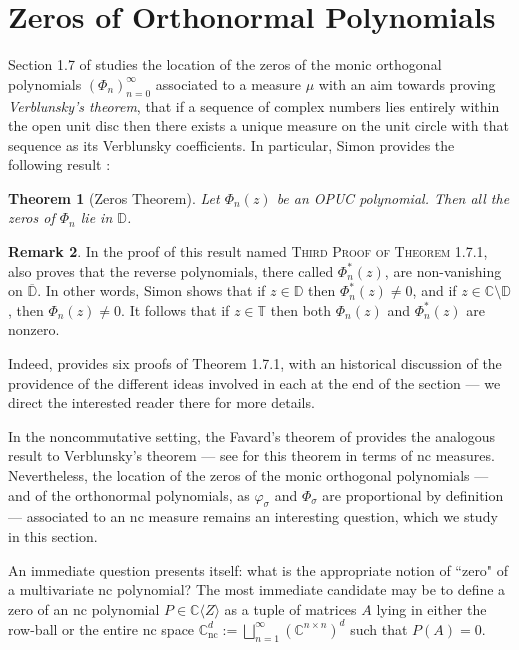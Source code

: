\documentclass[11pt,reqno]{amsart}
\def\p{\varphi}
\def\s{\sigma}
\def\P{\Phi}
\def\CC{\mathbb{C}}
\def\DD{\mathbb{D}}
\def\TT{\mathbb{T}}
\def\nc{\mathrm{nc}}
\def\dju{\bigsqcup_{n=1}^{\infty}}
\newtheorem{theorem}{Theorem}[section]
\theoremstyle{definition}
\newtheorem{remark}[theorem]{Remark}
\numberwithin{equation}{section}
\begin{document}
\section{Zeros of Orthonormal Polynomials}

Section 1.7 of \cite{Sim05} studies the location of the zeros of the monic orthogonal polynomials \((\P_n)_{n=0}^{\infty}\) associated to a measure \(\mu\) with an aim towards proving \emph{Verblunsky's theorem}, that if a sequence of complex numbers lies entirely within the open unit disc then there exists a unique measure on the unit circle with that sequence as its Verblunsky coefficients. In particular, Simon provides the following result \cite[Theorem 1.7.1]{Sim05}:
\begin{theorem}[Zeros Theorem]
    Let \(\P_n (z)\) be an OPUC polynomial. Then all the zeros of \(\P_n\) lie in \(\DD\).
\end{theorem}
\begin{remark}
    \label{rem:CommZeros}
    In the proof of this result named \textsc{Third Proof of Theorem 1.7.1}, \cite{Sim05} also proves that the reverse polynomials, there called \(\P_n^*(z)\), are non-vanishing on \(\overline{\DD}\). In other words, Simon shows that if \(z \in \DD\) then \(\P_n^*(z) \neq 0\), and if \(z \in \CC\setminus\DD\), then \(\P_n(z) \neq 0\). It follows that if \(z \in \TT\) then both \(\P_n(z)\) and \(\P_n^*(z)\) are nonzero.
\end{remark}
Indeed, \cite{Sim05} provides six proofs of Theorem 1.7.1, with an historical discussion of the providence of the different ideas involved in each at the end of the section --- we direct the interested reader there for more details.

In the noncommutative setting, the Favard's theorem of \cite{CJ02b} provides the analogous result to Verblunsky's theorem --- see  for this theorem in terms of nc measures. Nevertheless, the location of the zeros of the monic orthogonal polynomials --- and of the orthonormal polynomials, as \(\p_\s\) and \(\P_\s\) are proportional by definition --- associated to an nc measure remains an interesting question, which we study in this section.

An immediate question presents itself: what is the appropriate notion of ``zero" of a multivariate nc polynomial? The most immediate candidate may be to define a zero of an nc polynomial \(P \in \CC\langle Z \rangle\) as a tuple of matrices \(A\) lying in either the row-ball or the entire nc space \(\CC^d_{\nc} := \dju (\CC^{n\times n})^d\) such that \(P(A) = 0\).
\end{document}
